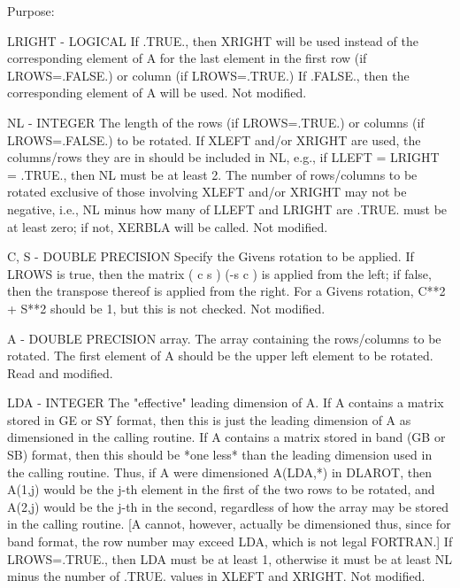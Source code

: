 \begin{DoxyParagraph}{Purpose\+: }
\begin{DoxyVerb}
  LRIGHT - LOGICAL
           If .TRUE., then XRIGHT will be used instead of the
           corresponding element of A for the last element in the
           first row (if LROWS=.FALSE.) or column (if LROWS=.TRUE.) If
           .FALSE., then the corresponding element of A will be used.
           Not modified.

  NL     - INTEGER
           The length of the rows (if LROWS=.TRUE.) or columns (if
           LROWS=.FALSE.) to be rotated.  If XLEFT and/or XRIGHT are
           used, the columns/rows they are in should be included in
           NL, e.g., if LLEFT = LRIGHT = .TRUE., then NL must be at
           least 2.  The number of rows/columns to be rotated
           exclusive of those involving XLEFT and/or XRIGHT may
           not be negative, i.e., NL minus how many of LLEFT and
           LRIGHT are .TRUE. must be at least zero; if not, XERBLA
           will be called.
           Not modified.

  C, S   - DOUBLE PRECISION
           Specify the Givens rotation to be applied.  If LROWS is
           true, then the matrix ( c  s )
                                 (-s  c )  is applied from the left;
           if false, then the transpose thereof is applied from the
           right.  For a Givens rotation, C**2 + S**2 should be 1,
           but this is not checked.
           Not modified.

  A      - DOUBLE PRECISION array.
           The array containing the rows/columns to be rotated.  The
           first element of A should be the upper left element to
           be rotated.
           Read and modified.

  LDA    - INTEGER
           The "effective" leading dimension of A.  If A contains
           a matrix stored in GE or SY format, then this is just
           the leading dimension of A as dimensioned in the calling
           routine.  If A contains a matrix stored in band (GB or SB)
           format, then this should be *one less* than the leading
           dimension used in the calling routine.  Thus, if
           A were dimensioned A(LDA,*) in DLAROT, then A(1,j) would
           be the j-th element in the first of the two rows
           to be rotated, and A(2,j) would be the j-th in the second,
           regardless of how the array may be stored in the calling
           routine.  [A cannot, however, actually be dimensioned thus,
           since for band format, the row number may exceed LDA, which
           is not legal FORTRAN.]
           If LROWS=.TRUE., then LDA must be at least 1, otherwise
           it must be at least NL minus the number of .TRUE. values
           in XLEFT and XRIGHT.
           Not modified.


\end{DoxyVerb}
\end{DoxyParagraph}

